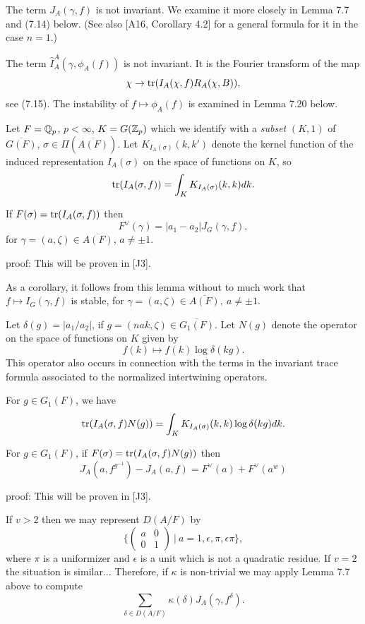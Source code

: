The term $J_A(\gamma,f)$ is not invariant. We examine it
more closely in Lemma 7.7 and (7.14) below.
(See also [A16, Corollary 4.2] for a general formula for it
in the case $n=1$.)

The term $\hat{I}_A^A(\gamma,\phi_A(f))$ is not invariant. It is the
Fourier transform of the map
\[
\chi\rightarrow {\rm tr}(I_A(\chi,f)R_A(\chi,B)),
\]
see (7.15). The instability of $f\longmapsto \phi_A(f)$ is
examined in Lemma 7.20 below.

Let $F=\mathbb{Q} _p$, $p<\infty$, $K=G({\Bbb{Z}}_p)$ which we
identify with a {\em subset} $(K,1)$ of $\overline{G(F)}$,
$\sigma\in \Pi(\overline{A(F)})$. Let $K_{I_A(\sigma)}(k,k')$
denote the kernel function of the induced representation
$I_A(\sigma)$ on the space of functions on $K$, so
\begin{equation}
{\rm tr}(I_A(\sigma,f))
=\int_K K_{I_A(\sigma)}(k,k)dk .
\end{equation}

\begin{lemma}
If $F(\sigma)={\rm tr}(I_A(\sigma,f))$ then
\[
F^\vee(\gamma)
=|a_1-a_2|J_G(\gamma,f),
\]
for $\gamma =(a,\zeta)\in \overline{A(F)}$, $a\not= \pm 1$.
\end{lemma}

proof: This will be proven in [J3].

As a corollary, it follows from this lemma without to much work
that $f\longmapsto I_G(\gamma,f)$ is stable, for
$\gamma =(a,\zeta)\in \overline{A(F)},\ a\not= \pm 1$.

Let $\delta(g)=|a_1/a_2|$, if $g=(nak,\zeta)\in \overline{G_1(F)}$. Let
$N(g)$ denote the operator on the space of functions on $K$ given by
\[
f(k)\longmapsto f(k)\log\delta(kg).
\]
This operator also occurs in connection with the terms in the
invariant trace formula associated to the normalized intertwining
operators.

\begin{lemma}
For $g\in G_1(F)$, we have
\[
{\rm tr}(I_A(\sigma,f)N(g))
=\int_K K_{I_A(\sigma)}(k,k)\log\delta(kg)dk.
\]
\end{lemma}

\begin{lemma}
For $g\in G_1(F)$, if
$F(\sigma)={\rm tr}(I_A(\sigma,f)N(g))$ then
\[
J_A(a,f^{g^{-1}})-J_A(a,f)
=F^\vee(a)+F^\vee(a^w)
\]
\end{lemma}
proof: This will be proven in [J3].

If $v>2$ then we may represent $D(A/F)$ by
\[
\{
\left(
\begin{array}{cc}
a&0\\
0&1
\end{array}
\right)\ |\ a=1,\epsilon, \pi, \epsilon\pi \},
\]
where $\pi$ is a uniformizer and $\epsilon$ is a unit
which is not a quadratic residue. If $v=2$ the situation is similar...
Therefore, if $\kappa$ is non-trivial
we may apply Lemma 7.7 above to compute
\[
\sum_{\delta\in D(A/F)}
\kappa(\delta)J_A(\gamma,f^\delta).
\]


